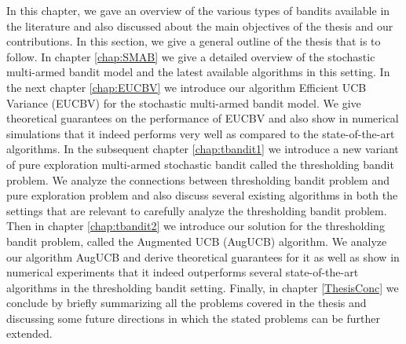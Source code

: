 In this chapter, we gave an overview of the various types of bandits available in the literature and also discussed about the main objectives of the thesis and our contributions. In this section, we give a general outline of the thesis that is to follow. In chapter \ref{chap:SMAB} we give a detailed overview of the stochastic multi-armed bandit model and the latest available algorithms in this setting. In the next chapter \ref{chap:EUCBV} we introduce our algorithm Efficient UCB Variance (EUCBV) for the stochastic multi-armed bandit model. We give theoretical guarantees on the performance of EUCBV and also show in numerical simulations that it indeed performs very well as compared to the state-of-the-art algorithms. In the subsequent chapter \ref{chap:tbandit1} we introduce a new variant of pure exploration multi-armed stochastic bandit called the thresholding bandit problem. We analyze the connections between thresholding bandit problem and pure exploration problem and also discuss several existing algorithms in both the settings that are relevant to carefully analyze the thresholding bandit problem. Then in chapter \ref{chap:tbandit2} we introduce our solution for the thresholding bandit problem, called the Augmented UCB (AugUCB) algorithm. We analyze our algorithm AugUCB and derive theoretical guarantees for it as well as show in numerical experiments that it indeed outperforms several state-of-the-art algorithms in the thresholding bandit setting. Finally, in chapter \ref{ThesisConc} we conclude by briefly summarizing all the problems covered in the thesis and discussing some future directions in which the stated problems can be further extended.


